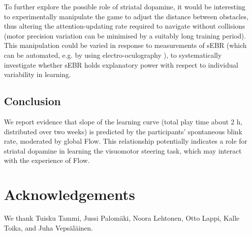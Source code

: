 \documentclass[10pt,letterpaper,floatsintext]{article}
\begin{document}
To further explore the possible role of striatal dopamine, it would be interesting to experimentally manipulate the game to adjust the distance between obstacles, thus altering the attention-updating rate required to navigate without collisions (motor precision variation can be minimised by a suitably long training period). This manipulation could be varied in response to measurements of sEBR (which can be automated, e.g. by using electro-oculography \cite{toivanen2014}), to systematically investigate whether sEBR holds explanatory power with respect to individual variability in learning.


\subsection{Conclusion}

We report evidence that slope of the learning curve (total play time about 2 h, distributed over two weeks) is predicted by the participants' spontaneous blink rate, moderated by global Flow. This relationship potentially indicates a role for striatal dopamine in learning the visuomotor steering task, which may interact with the experience of Flow.





\section{Acknowledgements}
We thank Tuisku Tammi, Jussi Palom\"{a}ki, Noora Lehtonen, Otto Lappi, Kalle Toika, and Juha Veps\"{a}l\"{a}inen.





\setlength{\bibleftmargin}{.125in}
\setlength{\bibindent}{-\bibleftmargin}


\end{document}
